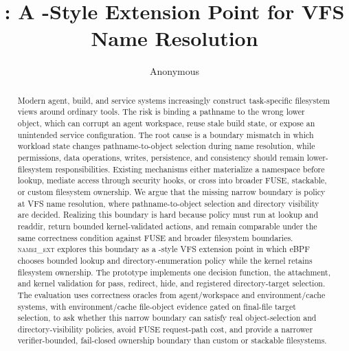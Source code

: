 \documentclass[10pt]{article}
\title{\namei: A \code{sched_ext}-Style Extension Point for VFS Name Resolution}
\author{Anonymous}
\date{}
\newcommand{\namei}{\textsc{namei\_ext}\xspace}
\newcommand{\code}[1]{\texttt{\detokenize{#1}}}
\begin{document}
\maketitle

\begin{abstract}
Modern agent, build, and service systems increasingly construct task-specific
filesystem views around ordinary tools. The risk is binding a pathname to the
wrong lower object, which can corrupt an agent workspace, reuse stale build
state, or expose an unintended service configuration. The root cause is a
boundary mismatch in which workload state changes pathname-to-object selection
during name resolution, while permissions, data operations, writes,
persistence, and consistency should remain lower-filesystem responsibilities.
Existing
mechanisms either materialize a namespace before lookup, mediate access through
security hooks, or cross into broader FUSE, stackable, or custom filesystem
ownership. We argue that the missing narrow boundary is policy at VFS name
resolution, where pathname-to-object selection and directory visibility are
decided. Realizing this boundary is hard because policy must run at lookup and
readdir, return bounded kernel-validated actions, and remain comparable under
the same correctness condition against FUSE and broader filesystem boundaries.
\namei explores this boundary as a \code{sched_ext}-style VFS extension point in which
eBPF chooses bounded lookup and directory-enumeration policy while the kernel
retains filesystem ownership. The prototype implements one decision function,
the \code{cgroup/namei_ext} attachment, and kernel validation for pass,
redirect, hide, and registered directory-target selection. The evaluation uses
correctness oracles from agent/workspace and environment/cache systems, with
environment/cache file-object evidence gated on final-file target selection, to
ask whether this narrow boundary can satisfy real object-selection and
directory-visibility policies, avoid FUSE request-path cost, and provide a
narrower verifier-bounded, fail-closed ownership boundary than custom or
stackable filesystems.
\end{abstract}











{\small


}
\end{document}
